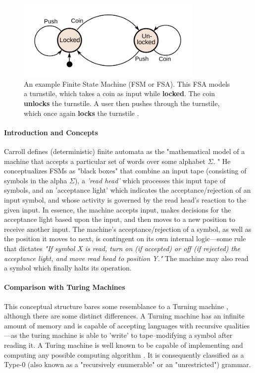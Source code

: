 \documentclass{report}
\newcommand{\state}[1]{\textbf{#1}}
\begin{document}
\begin{figure}
    \centering
    \includegraphics[width=0.8\textwidth]{fsa.png}
    \caption{An example Finite State Machine (FSM or FSA). This FSA models a turnstile, which takes a coin as input while \state{locked}. The coin \state{unlocks} the turnstile. A user then pushes through the turnstile, which once again \state{locks} the turnstile \cite{fsaPic}.}
    \label{fig:fsa}
\end{figure}


\paragraph{Introduction and Concepts}

Carroll defines (deterministic) finite automata as the "mathematical model of a machine that accepts a particular set of words over some alphabet $\Sigma$. \cite{FSM}" He conceptualizes FSMs as "black boxes" that combine an input tape (consisting of symbols in the alpha $\Sigma$), a \emph{'read head'} which processes this input tape of symbols, and an 'acceptance light' which indicates the acceptance/rejection of an input symbol, and whose activity is governed by the read head's reaction to the given input. In essence, the machine accepts input, makes decisions for the acceptance light based upon the input, and then moves to a new position to receive another input. The machine's acceptance/rejection of a symbol, as well as the position it moves to next, is contingent on its own internal logic---some rule that dictates \emph{"If symbol X is read, turn on (if accepted) or off (if rejected) the acceptance light, and move read head to position Y."} The machine may also read a symbol which finally halts its operation.

\paragraph{Comparison with Turing Machines}

This conceptual structure bares some resemblance to a Turning machine \cite{Turing}, although there are some distinct differences. A Turning machine has an infinite amount of memory and is capable of accepting languages with recursive qualities---as the turing machine is able to 'write' to tape--modifying a symbol after reading it. A Turing machine is well known to be capable of implementing and computing any possible computing algorithm \cite{Turing_2004}. It is consequently classified as a Type-0 (also known as a "recursively enumerable" or an "unrestricted") grammar.
\end{document}
